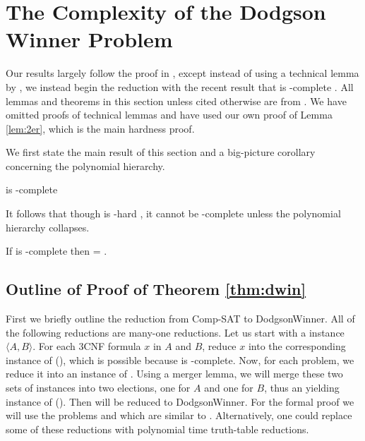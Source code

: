 \section{The Complexity of the Dodgson Winner Problem}
Our results largely follow the proof in \citet{exactdodgson}, except instead of
using a technical lemma by \citet{wag90}, we instead begin the reduction
with the recent result that  is \tp-complete \citep{compsat}.
All lemmas and theorems in this section
unless cited otherwise are from \citet{exactdodgson}.
We have omitted proofs of technical lemmas and have used our own proof of Lemma
\ref{lem:2er}, which is the main hardness proof.

We first state the main result of this section and a big-picture corollary
concerning the polynomial hierarchy.

\begin{theorem}\label{thm:dwin}
     is \tp-complete
\end{theorem}

It follows that though  is \np-hard \citep{bartholdiVoting},
it cannot be \np-complete unless the polynomial hierarchy collapses.

\begin{corollary}
    If  is \np-complete then  = \np.
\end{corollary}

\subsection{Outline of Proof of Theorem \ref{thm:dwin}} \label{subsec:outline}
    First we briefly outline the reduction from Comp-SAT to
DodgsonWinner.
    All of the following reductions are many-one reductions.
Let us start with a \csat instance $\langle A,B \rangle$.
For each 3CNF
formula $x$ in $A$ and $B$, reduce $x$ into the corresponding instance of
 (), which is possible because
 is \np-complete.
Now, for each  problem, we reduce it into an instance of
\dscore.
Using a merger lemma, we will merge these two sets of
\dscore instances into two elections, one for $A$
and one for $B$, thus an yielding
instance of  ().
Then  will be reduced to DodgsonWinner.
For the formal proof we will use the problems  and
 which are similar to \csat.
Alternatively, one could replace some of these reductions with
polynomial time truth-table reductions.

